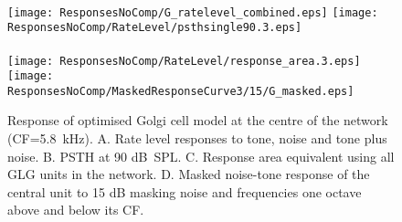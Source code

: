 \begin{figure}[htb]
{\hspace{0.5\textwidth}\hfill}\\
\texttt{[image: ResponsesNoComp/G\_ratelevel\_combined.eps]}%
\texttt{[image: ResponsesNoComp/RateLevel/psthsingle90.3.eps]}\\
{\hspace{0.5\textwidth}\hfill}\\
\texttt{[image: ResponsesNoComp/RateLevel/response\_area.3.eps]}%
\texttt{[image: ResponsesNoComp/MaskedResponseCurve3/15/G\_masked.eps]}\\
\caption[Optimised Golgi cell model responses]{Response of optimised Golgi cell model at the centre of the network (CF=5.8~kHz). 
A. Rate level responses to tone, noise and tone plus noise. 
B. PSTH at 90 dB~SPL.  
C. Response area equivalent using all GLG units in the network. 
D. Masked noise-tone response of the central unit to 15 dB masking noise and frequencies one octave above and below its CF.} \label{fig:Golgi_verification}
\end{figure}







